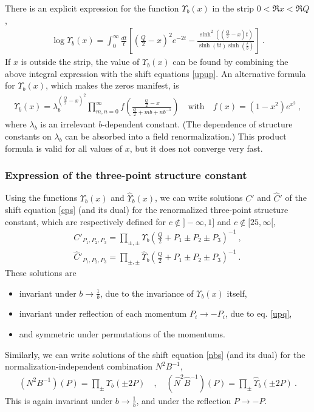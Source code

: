 \documentclass[12pt, a4paper, notitlepage, twoside]{report}
\numberwithin{equation}{section}
\theoremstyle{break}
\begin{document}
There is an explicit expression for the function $\Upsilon_b(x)$ in the strip $0<\Re x<\Re Q$, 
\begin{align}
 \log\Upsilon_b(x) = \int_0^\infty \frac{dt}{t} \left[\left(\tfrac{Q}{2}-x\right)^2 e^{-2t} -\frac{\sinh^2\left(\left(\frac{Q}{2}-x\right)\!t\right)}{\sinh (bt)\sinh\left(\frac{t}{b}\right)}\right]\ .
\label{lup}
\end{align}
If $x$ is outside the strip, the value of $\Upsilon_b(x)$ can be found by combining the above integral expression with the shift equations \eqref{upup}.
An alternative formula for $\Upsilon_b(x)$, which makes the zeros manifest, is 
\begin{align}
 \Upsilon_b(x) = \lambda_b^{(\frac{Q}{2}-x)^2}\prod_{m,n=0}^\infty f\left(\frac{\frac{Q}{2}-x}{\frac{Q}{2}+mb+nb^{-1}}\right) \quad \text{with} \quad f(x)=(1-x^2)e^{x^2}\ ,
\end{align}
where $\lambda_b$ is an irrelevant $b$-dependent constant. (The dependence of structure constants on $\lambda_b$ can be absorbed into a field renormalization.)
This product formula is valid for all values of $x$, but it does not converge very fast.

\subsubsection{Expression of the three-point structure constant}

Using the functions $\Upsilon_b(x)$ and $\hat\Upsilon_b(x)$, we can write solutions $C'$ and $\hat C'$ of the shift equation \eqref{cps} (and its dual) for the renormalized three-point structure constant, which are respectively defined for $c\notin ]-\infty, 1]$ and $c\notin [25,\infty[$,
\begin{align}
 \boxed{C'_{P_1,P_2,P_3} = \prod_{\pm,\pm} \Upsilon_b\left(\tfrac{Q}{2}+P_1\pm P_2 \pm P_3\right)^{-1} }\ ,
 \label{cp}
 \\
 \boxed{\hat C'_{P_1,P_2,P_3} = \prod_{\pm,\pm} \hat\Upsilon_b\left(\tfrac{Q}{2}+P_1\pm P_2 \pm P_3\right)^{-1}}\ .
 \label{hcp}
\end{align}
These solutions are 
\begin{itemize}
 \item invariant under $b\to \frac{1}{b}$, due to the invariance of $\Upsilon_b(x)$ itself,
 \item invariant under reflection of each momentum $P_i\to -P_i$, due to eq. \eqref{upq},
 \item and symmetric under permutations of the momentums.
\end{itemize}
Similarly, we can write solutions of the shift equation \eqref{nbs} (and its dual) for the normalization-independent combination $N^2B^{-1}$,
\begin{align}
 \boxed{\left(N^2B^{-1}\right)(P) =\prod_\pm \Upsilon_b(\pm 2P)} \quad , \quad \boxed{\left(\hat N^2\hat B^{-1}\right)(P) = \prod_\pm \hat\Upsilon_b(\pm 2P) } \ .
\end{align}
This is again invariant under $b\to \frac{1}{b}$, and under the reflection $P\to -P$.
\end{document}
